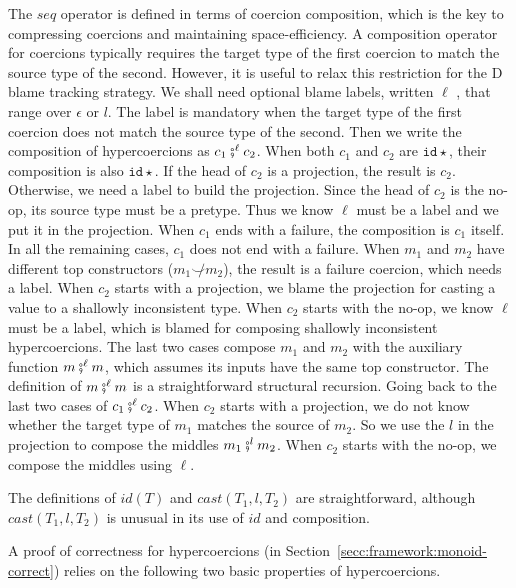 \documentclass[acmsmall,review]{acmart}\settopmatter{printfolios=true,printccs=false,printacmref=false}
\newcommand{\hyperCoercionI}[0]{\mathtt{id\star}}
\begin{document}
The $seq$ operator is defined in terms of coercion composition, which
is the key to compressing coercions and maintaining space-efficiency.
A composition operator for coercions typically requires the target
type of the first coercion to match the source type of the second.
However, it is useful to relax this restriction for the D blame
tracking strategy.
%
We shall need optional blame labels, written $\ell$ , that range over
$\epsilon$ or $l$. The label is mandatory when the target
type of the first coercion does not match the source type of the second. 
Then we write the composition of hypercoercions as $c_1
\fatsemi^\ell c_2$.  When both $c_1$ and $c_2$ are $\hyperCoercionI$,
their composition is also $\hyperCoercionI$.  If the head of $c_2$ is
a projection, the result is $c_2$.  Otherwise, we need a label to
build the projection. Since the head of $c_2$ is the no-op, its
source type must be a pretype. Thus we know $\ell$ must be a label and
we put it in the projection. When $c_1$ ends with a failure, the
composition is $c_1$ itself. In all the remaining cases, $c_1$ does
not end with a failure.  When $m_1$ and $m_2$ have different top
constructors ($m_1 \not\smile m_2$), the result is a failure coercion,
which needs a label. When $c_2$ starts with a projection, we blame the 
projection for casting a value to a shallowly inconsistent type. When $c_2$
starts with the no-op, we know $\ell$ must be a label, which is blamed for
composing shallowly inconsistent hypercoercions. The last two cases
compose $m_1$ and $m_2$ with the auxiliary function $m \fatsemi^\ell
m$, which assumes its inputs have the same top constructor. The
definition of $m \fatsemi^\ell m$ is a straightforward structural
recursion. Going back to the last two cases of $c_1 \fatsemi^\ell
c_2$. When $c_2$ starts with a projection, we do not know whether the
target type of $m_1$ matches the source of $m_2$. So we use the $l$ in the 
projection to  compose the middles $m_1 \fatsemi^l m_2$. When $c_2$ starts with 
the no-op, we compose the middles using $\ell$.

The definitions of $id(T)$ and $cast(T_1,l,T_2)$ are straightforward,
although $cast(T_1,l,T_2)$ is unusual in its use of $id$ and
composition.

A proof of correctness for hypercoercions (in 
Section~\ref{secc:framework:monoid-correct}) relies on the following
two basic properties of hypercoercions.
\end{document}
